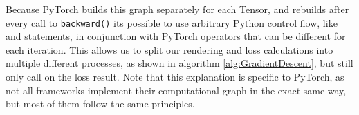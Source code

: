 Because PyTorch builds this graph separately for each Tensor, and rebuilds after every call to \texttt{backward()} its possible to use arbitrary Python control flow, like  and  statements, in conjunction with PyTorch operators that can be different for each iteration. This allows us to split our rendering and loss calculations into multiple different processes, as shown in algorithm \ref{alg:GradientDescent}, but still only call  on the loss result. Note that this explanation is specific to PyTorch, as not all frameworks implement their computational graph in the exact same way, but most of them follow the same principles.





